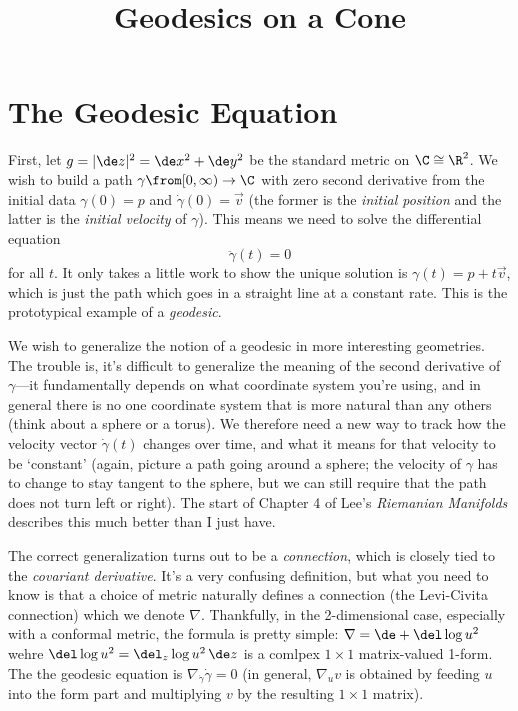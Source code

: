 \documentclass{article}
\title{Geodesics on a Cone}
\author{}
\date{}
\begin{document}
\maketitle

\section*{The Geodesic Equation}
First, let $g=|\de z|^2=\de x^2+\de y^2$ be the standard metric on $\C\cong\R^2$.  We wish to build a path $\gamma\from[0,\infty)\to\C$ with zero second derivative from the initial data $\gamma(0)=p$ and $\dot\gamma(0)=\vec v$ (the former is the \emph{initial position} and the latter is the \emph{initial velocity} of $\gamma$).  This means we need to solve the differential equation
\begin{equation}
    \ddot\gamma(t)=0
\end{equation}
for all $t$.  It only takes a little work to show the unique solution is $\gamma(t)=p+t\vec v$, which is just the path which goes in a straight line at a constant rate.  This is the prototypical example of a \emph{geodesic}.

We wish to generalize the notion of a geodesic in more interesting geometries.  The trouble is, it's difficult to generalize the meaning of the second derivative of $\gamma$---it fundamentally depends on what coordinate system you're using, and in general there is no one coordinate system that is more natural than any others (think about a sphere or a torus).  We therefore need a new way to track how the velocity vector $\dot\gamma(t)$ changes over time, and what it means for that velocity to be `constant' (again, picture a path going around a sphere; the velocity of $\gamma$ has to change to stay tangent to the sphere, but we can still require that the path does not turn left or right).  The start of Chapter 4 of Lee's \emph{Riemanian Manifolds} describes this much better than I just have.

The correct generalization turns out to be a \emph{connection}, which is closely tied to the \emph{covariant derivative}.  It's a very confusing definition, but what you need to know is that a choice of metric naturally defines a connection (the Levi-Civita connection) which we denote $\nabla$.  Thankfully, in the 2-dimensional case, especially with a conformal metric, the formula is pretty simple: $\nabla=\de+\del\log u^2$ wehre $\del\log u^2=\del_z\log u^2\,\de z$ is a comlpex $1\times 1$ matrix-valued 1-form.  The the geodesic equation is $\nabla_{\dot\gamma}\dot\gamma=0$ (in general, $\nabla_uv$ is obtained by feeding $u$ into the form part and multiplying $v$ by the resulting $1\times1$ matrix).
\end{document}
